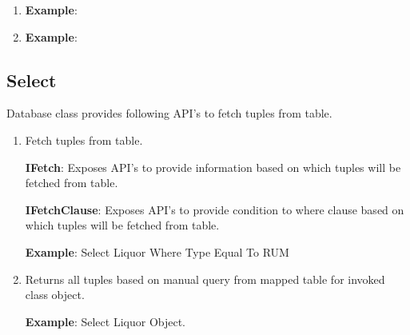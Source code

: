 		\begin{enumerate}

			\item \small 

				\par
				\textbf{Example}:
					

			\item \small 

				\par
				\textbf{Example}:
					

		\end{enumerate}
		

	\subsection{Select}

		\par
		Database class provides following API's to fetch tuples from table.

		\begin{enumerate}

			\item \small 

				\par
				Fetch tuples from table.

				\textbf{IFetch}: Exposes API's to provide information based on which tuples will be fetched from table.
					
	
			
				\textbf{IFetchClause}: Exposes API's to provide condition to where clause based on which tuples will be fetched from table.
					

				\textbf{Example}: Select Liquor Where Type Equal To RUM
					

			\item \small 

				\par
				Returns all tuples based on manual query from mapped table for invoked class object.

				\textbf{Example}: Select Liquor Object.
					


		\end{enumerate}



